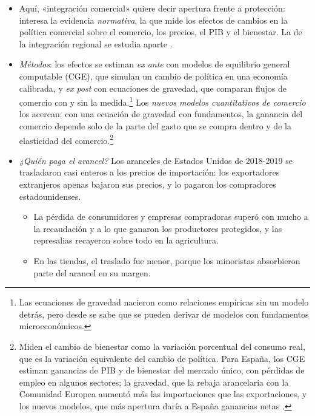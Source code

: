\documentclass[11pt]{article}
\begin{document}
\begin{itemize}
\item Aquí, «integración comercial» quiere decir apertura frente a protección: interesa la evidencia \emph{normativa}, la que mide los efectos de cambios en la política comercial sobre el comercio, los precios, el PIB y el bienestar. La de la integración regional se estudia aparte .
\item \emph{Métodos}: los efectos se estiman \emph{ex ante} con modelos de equilibrio general computable (CGE), que simulan un cambio de política en una economía calibrada, y \emph{ex post} con ecuaciones de gravedad, que comparan flujos de comercio con y sin la medida\nocite{Tinbergen1962Shaping}.\footnote{Las ecuaciones de gravedad nacieron como relaciones empíricas sin un modelo detrás, pero desde \textcite{EatonKortum2002Technology} se sabe que se pueden derivar de modelos con fundamentos microeconómicos.} Los \emph{nuevos modelos cuantitativos de comercio} los acercan: con una ecuación de gravedad con fundamentos, la ganancia del comercio depende solo de la parte del gasto que se compra dentro y de la elasticidad del comercio\nocite{ArkolakisCostinotRodriguezClare2012New,CostinotRodriguezClare2014Trade}.\footnote{Miden el cambio de bienestar como la variación porcentual del consumo real, que es la variación equivalente del cambio de política. Para España, los CGE estiman ganancias de PIB y de bienestar del mercado único, con pérdidas de empleo en algunos sectores\nocite{BajoRubioGomezPlana2005Simulating}; la gravedad, que la rebaja arancelaria con la Comunidad Europea aumentó más las importaciones que las exportaciones\nocite{Sanz2000Kalman}, y los nuevos modelos, que más apertura daría a España ganancias netas\nocite{CostinotRodriguezClare2014Trade} .}
\item \emph{¿Quién paga el arancel?} Los aranceles de Estados Unidos de 2018-2019 se trasladaron casi enteros a los precios de importación: los exportadores extranjeros apenas bajaron sus precios, y lo pagaron los compradores estadounidenses\nocite{Amiti2019Aranceles,Fajgelbaum2020Proteccionismo}.
  \begin{itemize}
  \item La pérdida de consumidores y empresas compradoras superó con mucho a la recaudación y a lo que ganaron los productores protegidos, y las represalias recayeron sobre todo en la agricultura\nocite{Fajgelbaum2020Proteccionismo}.
  \item En las tiendas, el traslado fue menor, porque los minoristas absorbieron parte del arancel en su margen\nocite{CavalloEtAl2021Tariff}.

\end{itemize}
\end{itemize}
\end{document}

